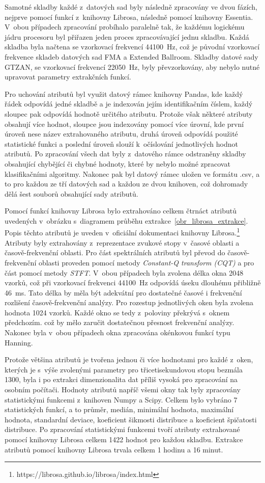 Samotné skladby každé z~datových sad byly následně zpracovány ve dvou fázích, nejprve pomocí funkcí z~knihovny Librosa, následně pomocí knihovny Essentia. V~obou případech zpracování probíhalo paralelně tak, že každému logickému jádru procesoru byl přiřazen jeden proces zpracovávající jednu skladbu. Každá skladba byla načtena se vzorkovací frekvencí 44100~Hz, což je původní vzorkovací frekvence skladeb datových sad FMA a Extended Ballroom. Skladby datové sady GTZAN, se vzorkovací frekvencí 22050~Hz, byly převzorkovány, aby nebylo nutné upravovat parametry extrakčních funkcí.

Pro uchování atributů byl využit datový rámec knihovny Pandas, kde každý řádek odpovídá jedné skladbě a je indexován jejím identifikačním číslem, každý sloupec pak odpovídá hodnotě určitého atributu. Protože však některé atributy obsahují více hodnot, sloupce jsou indexovány pomocí více úrovní, kde první úroveň nese název extrahovaného atributu, druhá úroveň odpovídá použité statistické funkci a poslední úroveň slouží k~očíslování jednotlivých hodnot atributů. Po zpracování všech dat byly z~datového rámce odstraněny skladby obsahující chybějící či chybné hodnoty, které by nebylo možné zpracovat klasifikačními algoritmy. Nakonec pak byl datový rámec uložen ve formátu .csv, a to pro každou ze tří datových sad a každou ze dvou knihoven, což dohromady dělá šest souborů obsahující sady atributů.

Pomocí funkcí knihovny Librosa bylo extrahováno celkem čtrnáct atributů uvedených v~obrázku s~diagramem průběhu extrakce~\ref{obr_librosa_extrakce}. Popis těchto atributů je uveden v~oficiální dokumentaci knihovny Librosa.\footnote{https://librosa.github.io/librosa/index.html} Atributy byly extrahovány z~reprezentace zvukové stopy v~časové oblasti a časově-frekvenční oblasti. Pro část spektrálních atributů byl převod do časově-frekvenční oblasti proveden pomocí metody \textit{Constant-Q transform (CQT)} a pro část pomocí metody \textit{STFT}. V~obou případech byla zvolena délka okna 2048 vzorků, což při vzorkovací frekvenci 44100~Hz odpovídá úseku dlouhému přibližně 46~ms. Tato délka by měla být adekvátní pro dostatečné časové i frekvenční rozlišení časově-frekvenční analýzy. Pro rozestup jednotlivých oken byla zvolena hodnota 1024 vzorků. Každé okno se tedy z~poloviny překrývá s~oknem předchozím. což by mělo zaručit dostatečnou přesnost frekvenční analýzy. Nakonec byla v~obou případech okna zpracována okénkovou funkcí typu Hanning.

Protože většina atributů je tvořena jednou či více hodnotami pro každé z~oken, kterých je s~výše zvolenými parametry pro třicetisekundovou stopu bezmála 1300, byla i po extrakci dimenzionalita dat příliš vysoká pro zpracování na osobním počítači. Hodnoty atributů napříč všemi okny tak byly zpracovány statistickými funkcemi z~knihoven Numpy a Scipy. Celkem bylo vybráno 7 statistických funkcí, a to průměr, medián, minimální hodnota, maximální hodnota, standardní deviace, koeficient šikmosti distribuce a koeficient špičatosti distribuce. Po zpracování statistickými funkcemi tvoří atributy extrahované pomocí knihovny Librosa celkem 1422 hodnot pro každou skladbu. Extrakce atributů pomocí knihovny Librosa trvala celkem 1 hodinu a 16 minut.


